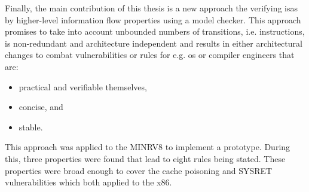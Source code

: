 Finally, the main contribution of this thesis is a new approach the verifying \glspl{isa} by higher-level information flow properties using a model checker.
This approach promises to take into account unbounded numbers of transitions, i.e. instructions, is non-redundant and architecture independent and results in either architectural changes to combat vulnerabilities or rules for e.g. \gls{os} or compiler engineers that are:
\begin{itemize}
    \item practical and verifiable themselves,
    \item concise, and
    \item stable.
\end{itemize}

This approach was applied to the MINRV8 to implement a prototype.
During this, three properties were found that lead to eight rules being stated.
These properties were broad enough to cover the cache poisoning and SYSRET vulnerabilities which both applied to the x86.
